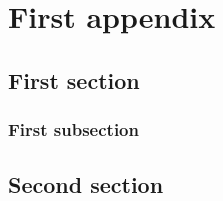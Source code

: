 
\chapter{First appendix}
\section{First section}
\subsection{First subsection}

\section{Second section}
